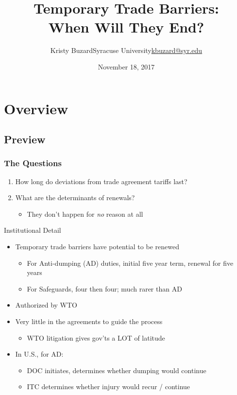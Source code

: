 \documentclass[handout]{beamer}
\title[Temporary Trade Barriers: When Will They End?\hspace{2.35in}\insertframenumber/\inserttotalframenumber]{Temporary Trade Barriers: \\ When Will They End?}
\author[Kristy Buzard]{\texorpdfstring{Kristy Buzard\newline Syracuse University\newline\url{kbuzard@syr.edu}}{Kristy Buzard}}
\date{November 18, 2017}
\begin{document}
\maketitle




\section{Overview}
\subsection{Preview}
\begin{frame}
\frametitle{The Questions}
\pause
\begin{enumerate}[<+->]
	\item How long do deviations from trade agreement tariffs last? 
  \item What are the determinants of renewals?
		\begin{itemize}
			\item They don't happen for \textit{no} reason at all
		\end{itemize}
\end{enumerate}
\end{frame}


\begin{frame}{Institutional Detail}
\begin{itemize}[<+->]
	\item Temporary trade barriers have potential to be renewed
		\begin{itemize}
			\item For Anti-dumping (AD) duties, initial five year term, renewal for five years
			\item For Safeguards, four then four; much rarer than AD
		\end{itemize}
	\item Authorized by WTO
	\item Very little in the agreements to guide the process
		\begin{itemize}
			\item WTO litigation gives gov'ts a LOT of latitude
		\end{itemize}
	\item In U.S., for AD:
		\begin{itemize}
			\item DOC initiates, determines whether dumping would continue
			\item ITC determines whether injury would recur / continue
		\end{itemize}
\end{itemize}
\end{frame}
\end{document}
